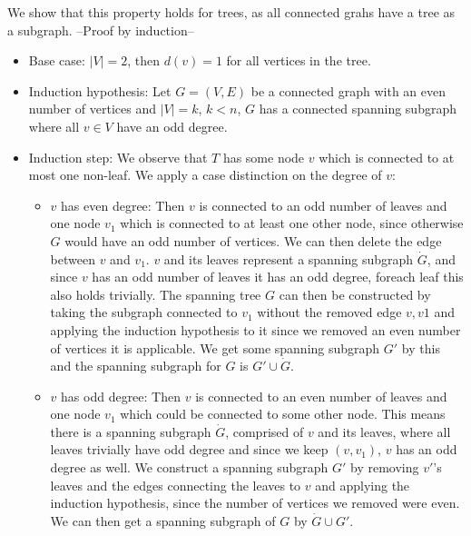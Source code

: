 \documentclass[
]{article}
\providecommand{\tightlist}{%
  \setlength{\itemsep}{0pt}\setlength{\parskip}{0pt}}
\begin{document}
We show that this property holds for trees, as all connected grahs have
a tree as a subgraph. --Proof by induction--

\begin{itemize}
\tightlist
\item
  Base case: \(|V| = 2\), then \(d(v) = 1\) for all vertices in the
  tree.
\item
  Induction hypothesis: Let \(G=(V,E)\) be a connected graph with an
  even number of vertices and \(|V| = k\), \(k < n\), \(G\) has a
  connected spanning subgraph where all \(v \in V\) have an odd degree.
\item
  Induction step: We observe that \(T\) has some node \(v\) which is
  connected to at most one non-leaf. We apply a case distinction on the
  degree of \(v\):

  \begin{itemize}
  \tightlist
  \item
    \(v\) has even degree: Then \(v\) is connected to an odd number of
    leaves and one node \(v_1\) which is connected to at least one other
    node, since otherwise \(G\) would have an odd number of vertices. We
    can then delete the edge between \(v\) and \(v_1\). \(v\) and its
    leaves represent a spanning subgraph \(\dot G\), and since \(v\) has
    an odd number of leaves it has an odd degree, foreach leaf this also
    holds trivially. The spanning tree \(G\) can then be constructed by
    taking the subgraph connected to \(v_1\) without the removed edge
    \(v,v1\) and applying the induction hypothesis to it since we
    removed an even number of vertices it is applicable. We get some
    spanning subgraph \(G'\) by this and the spanning subgraph for \(G\)
    is \(G' \cup \dot G\).
  \item
    \(v\) has odd degree: Then \(v\) is connected to an even number of
    leaves and one node \(v_1\) which could be connected to some other
    node. This means there is a spanning subgraph \(\dot G\), comprised
    of \(v\) and its leaves, where all leaves trivially have odd degree
    and since we keep \((v,v_1)\), \(v\) has an odd degree as well. We
    construct a spanning subgraph \(G'\) by removing \(v'\)'s leaves and
    the edges connecting the leaves to \(v\) and applying the induction
    hypothesis, since the number of vertices we removed were even. We
    can then get a spanning subgraph of \(G\) by \(\dot G \cup G'\).
  \end{itemize}
\end{itemize}
\end{document}

